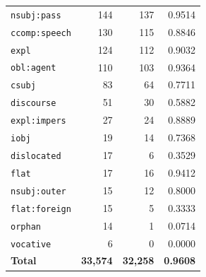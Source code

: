 \begin{table}[ht]
\begin{tabular}{lrrr}
\texttt{nsubj\!:\!pass} & 144 & 137 & 0.9514 \\
\texttt{ccomp\!:\!speech} & 130 & 115 & 0.8846 \\
\texttt{expl} & 124 & 112 & 0.9032 \\
\texttt{obl\!:\!agent} & 110 & 103 & 0.9364 \\
\texttt{csubj} & 83 & 64 & 0.7711 \\
\texttt{discourse} & 51 & 30 & 0.5882 \\
\texttt{expl\!:\!impers} & 27 & 24 & 0.8889 \\
\texttt{iobj} & 19 & 14 & 0.7368 \\
\texttt{dislocated} & 17 & 6 & 0.3529 \\
\texttt{flat} & 17 & 16 & 0.9412 \\
\texttt{nsubj\!:\!outer} & 15 & 12 & 0.8000 \\
\texttt{flat\!:\!foreign} & 15 & 5 & 0.3333 \\
\texttt{orphan} & 14 & 1 & 0.0714 \\
\texttt{vocative} & 6 & 0 & 0.0000 \\
\midrule
\textbf{Total} & \textbf{33,574} & \textbf{32,258} & \textbf{0.9608} \\
\bottomrule
\end{tabular}
\end{table}

